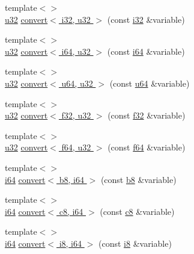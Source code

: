 \begin{DoxyCompactItemize}
\item 
{\footnotesize template$<$$>$ }\\\hyperlink{types_8h_afaa62991928fb9fb18ff0db62a040aba}{u32} \hyperlink{namespacecrap_af5ca39334b5ad28a67bc83d43a3aafda}{convert$<$ i32, u32 $>$} (const \hyperlink{types_8h_a48d6cd8e4135fb2ff7e7f2dac84089ec}{i32} \&variable)
\item 
{\footnotesize template$<$$>$ }\\\hyperlink{types_8h_afaa62991928fb9fb18ff0db62a040aba}{u32} \hyperlink{namespacecrap_a04d2ef65cc54821bbc19fcac6b53a609}{convert$<$ i64, u32 $>$} (const \hyperlink{types_8h_a85cb35fbe5bf2961d7ad5f26814a91a2}{i64} \&variable)
\item 
{\footnotesize template$<$$>$ }\\\hyperlink{types_8h_afaa62991928fb9fb18ff0db62a040aba}{u32} \hyperlink{namespacecrap_ab9f4ec6c33639afdabcddf143f898946}{convert$<$ u64, u32 $>$} (const \hyperlink{types_8h_a3f7e2bcbb0b4c338f3c4f6c937cd4234}{u64} \&variable)
\item 
{\footnotesize template$<$$>$ }\\\hyperlink{types_8h_afaa62991928fb9fb18ff0db62a040aba}{u32} \hyperlink{namespacecrap_a49f4ccf98784330cdb68237ee9210b59}{convert$<$ f32, u32 $>$} (const \hyperlink{types_8h_a154db6eda6a99565cb060a1da4b4c930}{f32} \&variable)
\item 
{\footnotesize template$<$$>$ }\\\hyperlink{types_8h_afaa62991928fb9fb18ff0db62a040aba}{u32} \hyperlink{namespacecrap_ac6ab6d102ebb0301665d1da2819a7be9}{convert$<$ f64, u32 $>$} (const \hyperlink{types_8h_a76c9f53497f766e57b184bc8a93ab73f}{f64} \&variable)
\item 
{\footnotesize template$<$$>$ }\\\hyperlink{types_8h_a85cb35fbe5bf2961d7ad5f26814a91a2}{i64} \hyperlink{namespacecrap_aaa997d40c4baa09a61d37ad937eae08e}{convert$<$ b8, i64 $>$} (const \hyperlink{types_8h_a74eb47b4ab9e428eab7b91b3b877fa6c}{b8} \&variable)
\item 
{\footnotesize template$<$$>$ }\\\hyperlink{types_8h_a85cb35fbe5bf2961d7ad5f26814a91a2}{i64} \hyperlink{namespacecrap_aad740cea8d501653ff63c7184c88d999}{convert$<$ c8, i64 $>$} (const \hyperlink{types_8h_aa1ba8aac9fcd831012308297336ac74b}{c8} \&variable)
\item 
{\footnotesize template$<$$>$ }\\\hyperlink{types_8h_a85cb35fbe5bf2961d7ad5f26814a91a2}{i64} \hyperlink{namespacecrap_a4ef0fd5a0ead98b3841974239f5709b8}{convert$<$ i8, i64 $>$} (const \hyperlink{types_8h_ae3702327b5f47e83b431e22b33da7b58}{i8} \&variable)

\end{DoxyCompactItemize}
